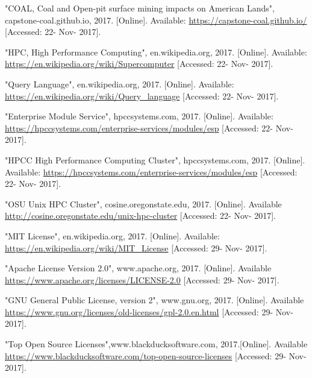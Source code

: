 \documentclass[10pt,draftclsnofoot,onecolumn,journal,compsoc]{IEEEtran}
\begin{document}
\begin{thebibliography}{9}
 "COAL, Coal and Open-pit surface mining impacts on American Lands", capstone-coal.github.io, 2017. [Online]. Available: \url{https://capstone-coal.github.io/} [Accessed: 22- Nov- 2017].

 "HPC, High Performance Computing", en.wikipedia.org, 2017. [Online]. Available: \url{https://en.wikipedia.org/wiki/Supercomputer} [Accessed: 22- Nov- 2017].

 "Query Language", en.wikipedia.org, 2017. [Online]. Available: \url{https://en.wikipedia.org/wiki/Query_language} [Accessed: 22- Nov- 2017].

 "Enterprise Module Service", hpccsystems.com, 2017. [Online]. Available: \url{https://hpccsystems.com/enterprise-services/modules/esp} [Accessed: 22- Nov- 2017].

 "HPCC High Performance Computing Cluster", hpccsystems.com, 2017. [Online]. Available: \url{https://hpccsystems.com/enterprise-services/modules/esp} [Accessed: 22- Nov- 2017].

 "OSU Unix HPC Cluster", cosine.oregonstate.edu, 2017. [Online]. Available \url{http://cosine.oregonstate.edu/unix-hpc-cluster} [Accessed: 22- Nov- 2017].

 "MIT License", en.wikipedia.org, 2017. [Online]. Available: \url{https://en.wikipedia.org/wiki/MIT_License} [Accessed: 29- Nov- 2017].

 "Apache License Version 2.0", www.apache.org, 2017. [Online]. Available \url{https://www.apache.org/licenses/LICENSE-2.0} [Accessed: 29- Nov- 2017].

 "GNU General Public License, version 2", www.gnu.org, 2017. [Online]. Available \url{https://www.gnu.org/licenses/old-licenses/gpl-2.0.en.html} [Accessed: 29- Nov- 2017].

 "Top Open Source Licenses",www.blackducksoftware.com, 2017.[Online]. Available \url{https://www.blackducksoftware.com/top-open-source-licenses} [Accessed: 29- Nov- 2017].
\end{thebibliography}
\end{document}
